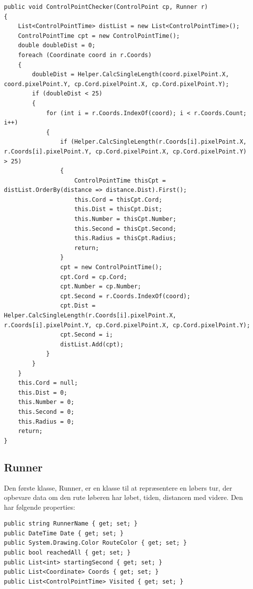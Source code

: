 \begin{lstlisting}
public void ControlPointChecker(ControlPoint cp, Runner r)
{
    List<ControlPointTime> distList = new List<ControlPointTime>();
    ControlPointTime cpt = new ControlPointTime();
    double doubleDist = 0;
    foreach (Coordinate coord in r.Coords)
    {
        doubleDist = Helper.CalcSingleLength(coord.pixelPoint.X, coord.pixelPoint.Y, cp.Cord.pixelPoint.X, cp.Cord.pixelPoint.Y);
        if (doubleDist < 25)
        {
            for (int i = r.Coords.IndexOf(coord); i < r.Coords.Count; i++)
            {
                if (Helper.CalcSingleLength(r.Coords[i].pixelPoint.X, r.Coords[i].pixelPoint.Y, cp.Cord.pixelPoint.X, cp.Cord.pixelPoint.Y) > 25)
                {
                    ControlPointTime thisCpt = distList.OrderBy(distance => distance.Dist).First();
                    this.Cord = thisCpt.Cord;
                    this.Dist = thisCpt.Dist;
                    this.Number = thisCpt.Number;
                    this.Second = thisCpt.Second;
                    this.Radius = thisCpt.Radius;
                    return;
                }
                cpt = new ControlPointTime();
                cpt.Cord = cp.Cord;
                cpt.Number = cp.Number;
                cpt.Second = r.Coords.IndexOf(coord);
                cpt.Dist = Helper.CalcSingleLength(r.Coords[i].pixelPoint.X, r.Coords[i].pixelPoint.Y, cp.Cord.pixelPoint.X, cp.Cord.pixelPoint.Y);
                cpt.Second = i;
                distList.Add(cpt);
            }    
        }
    }
    this.Cord = null;
    this.Dist = 0;
    this.Number = 0;
    this.Second = 0;
    this.Radius = 0;
    return;
}
\end{lstlisting}

\subsection{Runner}
Den første klasse, Runner, er en klasse til at repræsentere en løbers tur, der opbevare data om den rute løberen har løbet, tiden, distancen med videre. Den har følgende properties:

\begin{lstlisting}
public string RunnerName { get; set; }
public DateTime Date { get; set; }
public System.Drawing.Color RouteColor { get; set; }
public bool reachedAll { get; set; }
public List<int> startingSecond { get; set; }
public List<Coordinate> Coords { get; set; }
public List<ControlPointTime> Visited { get; set; }
\end{lstlisting}

